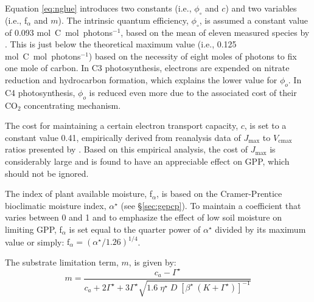 Equation \ref{eq:nglue} introduces two constants (i.e., $\phi_{\circ}$ and $c$) and two variables (i.e., f$_\alpha$ and $m$).
The intrinsic quantum efficiency, $\phi_{\circ}$, is assumed a constant value of 0.093 mol~C~mol~photons$^{-1}$, based on the mean of eleven measured species by \cite{long93}. 
This is just below the theoretical maximum value (i.e., 0.125 mol~C~mol~photons$^{-1}$) based on the necessity of eight moles of photons to fix one mole of carbon.
In C3 photosynthesis, electrons are expended on nitrate reduction and hydrocarbon formation, which explains the lower value for $\phi_o$.
In C4 photosynthesis, $\phi_o$ is reduced even more due to the associated cost of their CO$_2$ concentrating mechanism. 

The cost for maintaining a certain electron transport capacity, $c$, is set to a constant value 0.41, empirically derived from reanalysis data of $J_\text{max}$ to $V_\text{cmax}$ ratios presented by \cite{kattge07}.
Based on this empirical analysis, the cost of $J_\text{max}$ is considerably large and is found to have an appreciable effect on GPP, which should not be ignored.

The index of plant available moisture, f$_\alpha$, is based on the Cramer-Prentice bioclimatic moisture index, $\alpha^\star$ (see \S \ref{sec:gepcp}). 
To maintain a coefficient that varies between 0 and 1 and to emphasize the effect of low soil moisture on limiting GPP, f$_\alpha$ is set equal to the quarter power of $\alpha^\star$ divided by its maximum value or simply: 
$\text{f}_\alpha = \left(\alpha^\star/1.26\right)^{1/4}$.

The substrate limitation term, $m$, is given by:
%
\begin{equation}
\label{eq:m}
    m = \frac{c_a - \Gamma^\star}
             {c_a 
              + 2 \Gamma^\star 
              + 3 \Gamma^\star \sqrt{
                1.6\; \eta^\star\; D\; \left[
                  \beta^\star\: \left(K + \Gamma^\star\right)
                \right]^{-1}
              }
             }
\end{equation}

